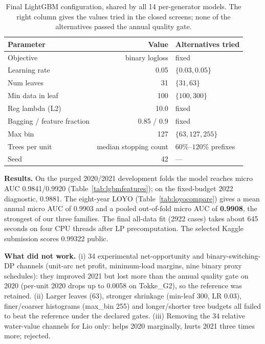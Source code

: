 \documentclass{article}
\begin{document}
\begin{table}[h]
    \centering
    \begin{tabular}{lrl}
        \hline
        Parameter & Value & Alternatives tried \\
        \hline
        Objective & binary logloss & fixed \\
        Learning rate & 0.05 & $\{0.03, 0.05\}$ \\
        Num leaves & 31 & $\{31, 63\}$ \\
        Min data in leaf & 100 & $\{100, 300\}$ \\
        Reg lambda (L2) & 10.0 & fixed \\
        Bagging / feature fraction & 0.85 / 0.9 & fixed \\
        Max bin & 127 & $\{63, 127, 255\}$ \\
        Trees per unit & median stopping count & $60\%$--$120\%$ prefixes \\
        Seed & 42 & --- \\
        \hline
    \end{tabular}
    \caption{Final LightGBM configuration, shared by all 14
    per-generator models. The right column gives the values tried in the
    closed screens; none of the alternatives passed the annual quality
    gate.}
    \label{tab:lgbmparams}
\end{table}

\textbf{Results.} On the purged 2020/2021 development folds the model
reaches micro AUC 0.9841/0.9920 (Table~\ref{tab:lgbmfeatures}); on the
fixed-budget 2022 diagnostic, 0.9881. The eight-year LOYO
(Table~\ref{tab:loyocompare}) gives a mean annual micro AUC of 0.9903
and a pooled out-of-fold micro AUC of \textbf{0.9908}, the strongest of
our three families. The final all-data fit (2922 cases) takes about 645
seconds on four CPU threads after LP precomputation. The selected Kaggle
submission scores 0.99322 public.

\textbf{What did not work.} (i) 34 experimental net-opportunity and
binary-switching-DP channels (unit-arc net profit, minimum-load margins,
nine binary proxy schedules): they improved 2021 but lost more than the
annual quality gate on 2020 (per-unit 2020 drops up to 0.0058 on
Tokke\_G2), so the reference was retained. (ii) Larger leaves (63),
stronger shrinkage (min-leaf 300, LR 0.03), finer/coarser histograms
(max\_bin 255) and longer/shorter tree budgets all failed to beat the
reference under the declared gates. (iii) Removing the 34 relative
water-value channels for Lio only: helps 2020 marginally, hurts 2021
three times more; rejected.
\end{document}
